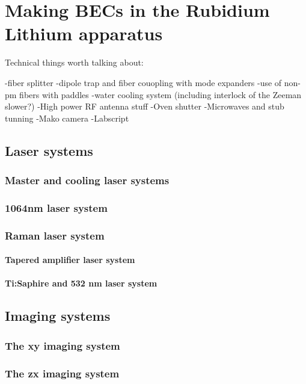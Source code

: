 


\renewcommand{\thechapter}{4}


\chapter{Making BECs in the Rubidium Lithium apparatus}

Technical things worth talking about:

-fiber splitter
-dipole trap and fiber couopling with mode expanders
-use of non-pm fibers with paddles
-water cooling system (including interlock of the Zeeman slower?)
-High power RF antenna stuff
-Oven shutter
-Microwaves and stub tunning
-Mako camera
-Labscript



\section{Laser systems}
\subsection{Master and cooling laser systems}
\subsection{1064nm laser system}
\subsection{Raman laser system}
\subsubsection{Tapered amplifier laser system}
\subsubsection{Ti:Saphire and 532 nm laser system}

\section{Imaging systems}
\subsection{The xy imaging system}
\subsection{The zx imaging system}
